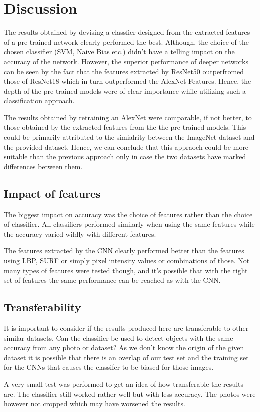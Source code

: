 \documentclass[doc/report.tex]{subfiles}
\begin{document}
\section{Discussion}
The results obtained by devising a classfier designed from the extracted
features of a pre-trained network clearly performed the best. Although, the
choice of the chosen classifier (SVM, Naive Bias etc.) didn't have a telling
impact on the accuracy of the network. However, the superior performance of
deeper networks can be seen by the fact that the features extracted by ResNet50
outperfromed those of ResNet18 which in turn outperformed the AlexNet Features.
Hence, the depth of the pre-trained models were of clear importance while
utilizing such a classification approach.

The results obtained by retraining an AlexNet were comparable, if not better,
to those obtained by the extracted features from the the pre-trained models.
This could be primarily attributed to the simialrity between the ImageNet
dataset and the provided dataset. Hence, we can conclude that this appraoch
could be more suitable than the previous approach only in case the two datasets
have marked differences between them.  

\subsection{Impact of features}
The biggest impact on accuracy was the choice of features rather than the
choice of classifier. All classifiers performed similarly when using the same
features while the accuracy varied wildly with different features.

The features extracted by the CNN clearly performed better than the features
using LBP, SURF or simply pixel intensity values or combinations of those. Not
many types of features were tested though, and it's possible that with the
right set of features the same performance can be reached as with the CNN.

\subsection{Transferability}
It is important to consider if the results produced here are transferable to
other similar datasets. Can the classifier be used to detect objects with the
same accuracy from any photo or dataset? As we don't know the origin of the
given dataset it is possible that there is an overlap of our test set and the
training set for the CNNs that causes the classifer to be biased for those
images.

A very small test was performed to get an idea of how transferable the results
are. The classifier still worked rather well but with less accuracy. The photos
were however not cropped which may have worsened the results. 
    
\end{document}
